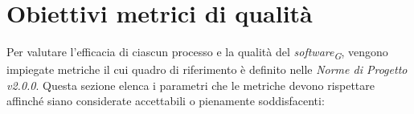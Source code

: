 \section{Obiettivi metrici di qualità}
Per valutare l'efficacia di ciascun processo e la qualità del \textit{software}\textsubscript{\textit{G}}, vengono impiegate metriche il cui quadro di riferimento è definito nelle \textit{Norme di Progetto v2.0.0}. Questa sezione elenca i parametri che le metriche devono rispettare affinché siano considerate accettabili o pienamente soddisfacenti:



\pagebreak




